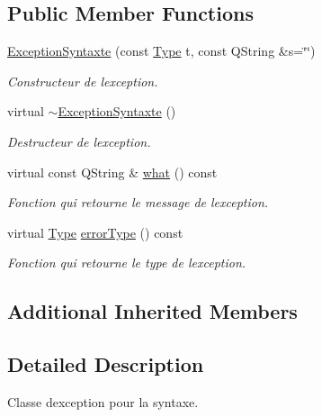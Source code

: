 \subsection*{Public Member Functions}
\begin{DoxyCompactItemize}
\item 
\hyperlink{class_exception_syntaxte_aecef7a63420245c5b812125193a4e3f6}{Exception\+Syntaxte} (const \hyperlink{class_exception_syntaxte_aca9b3139fcaa2b0101b9207fccf3d816}{Type} t, const Q\+String \&s=\char`\"{}\char`\"{})
\begin{DoxyCompactList}\small\item\em Constructeur de l\textquotesingle{}exception. \end{DoxyCompactList}\item 
virtual \hyperlink{class_exception_syntaxte_a1f1fde8849e41fd38cb26ee97425a10d}{$\sim$\+Exception\+Syntaxte} ()\hypertarget{class_exception_syntaxte_a1f1fde8849e41fd38cb26ee97425a10d}{}\label{class_exception_syntaxte_a1f1fde8849e41fd38cb26ee97425a10d}

\begin{DoxyCompactList}\small\item\em Destructeur de l\textquotesingle{}exception. \end{DoxyCompactList}\item 
virtual const Q\+String \& \hyperlink{class_exception_syntaxte_a6bfbd6fe64c17610db8196c778e29758}{what} () const 
\begin{DoxyCompactList}\small\item\em Fonction qui retourne le message de l\textquotesingle{}exception. \end{DoxyCompactList}\item 
virtual \hyperlink{class_exception_syntaxte_aca9b3139fcaa2b0101b9207fccf3d816}{Type} \hyperlink{class_exception_syntaxte_af734fcfcfe0256aef75e48dcc886be40}{error\+Type} () const 
\begin{DoxyCompactList}\small\item\em Fonction qui retourne le type de l\textquotesingle{}exception. \end{DoxyCompactList}\end{DoxyCompactItemize}
\subsection*{Additional Inherited Members}


\subsection{Detailed Description}
Classe d\textquotesingle{}exception pour la syntaxe. 

